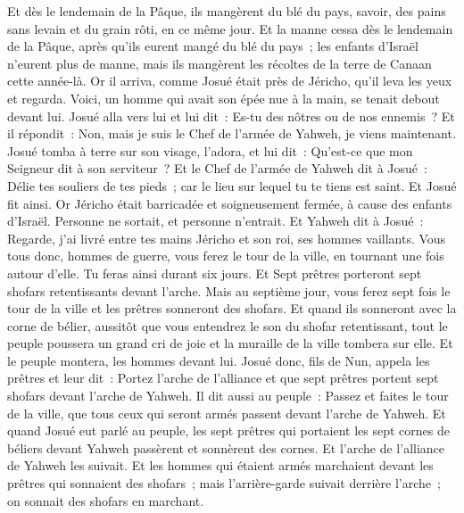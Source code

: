 \begin{multicols}{2}
Et dès le lendemain de la Pâque, ils mangèrent du blé du pays, savoir, des pains sans levain et du grain rôti, en ce même jour.
Et la manne cessa dès le lendemain de la Pâque, après qu'ils eurent mangé du blé du pays~; les enfants d'Israël n'eurent plus de manne, mais ils mangèrent les récoltes de la terre de Canaan cette année-là.
Or il arriva, comme Josué était près de Jéricho, qu'il leva les yeux et regarda. Voici, un homme qui avait son épée nue à la main, se tenait debout devant lui. Josué alla vers lui et lui dit~: Es-tu des nôtres ou de nos ennemis~?
Et il répondit~: Non, mais je suis le Chef de l'armée de Yahweh, je viens maintenant. Josué tomba à terre sur son visage, l'adora, et lui dit~: Qu'est-ce que mon Seigneur dit à son serviteur~?
Et le Chef de l'armée de Yahweh dit à Josué~: Délie tes souliers de tes pieds~; car le lieu sur lequel tu te tiens est saint. Et Josué fit ainsi.
\VerseOne{}Or Jéricho était barricadée et soigneusement fermée, à cause des enfants d'Israël. Personne ne sortait, et personne n'entrait.
Et Yahweh dit à Josué~: Regarde, j'ai livré entre tes mains Jéricho et son roi, ses hommes vaillants.
Vous tous donc, hommes de guerre, vous ferez le tour de la ville, en tournant une fois autour d'elle. Tu feras ainsi durant six jours.
Et Sept prêtres porteront sept shofars retentissants devant l'arche. Mais au septième jour, vous ferez sept fois le tour de la ville et les prêtres sonneront des shofars.
Et quand ils sonneront avec la corne de bélier, aussitôt que vous entendrez le son du shofar retentissant, tout le peuple poussera un grand cri de joie et la muraille de la ville tombera sur elle. Et le peuple montera, les hommes devant lui.
Josué donc, fils de Nun, appela les prêtres et leur dit~: Portez l'arche de l'alliance et que sept prêtres portent sept shofars devant l'arche de Yahweh.
Il dit aussi au peuple~: Passez et faites le tour de la ville, que tous ceux qui seront armés passent devant l'arche de Yahweh.
Et quand Josué eut parlé au peuple, les sept prêtres qui portaient les sept cornes de béliers devant Yahweh passèrent et sonnèrent des cornes. Et l'arche de l'alliance de Yahweh les suivait.
Et les hommes qui étaient armés marchaient devant les prêtres qui sonnaient des shofars~; mais l'arrière-garde suivait derrière l'arche~; on sonnait des shofars en marchant.

\end{multicols}
